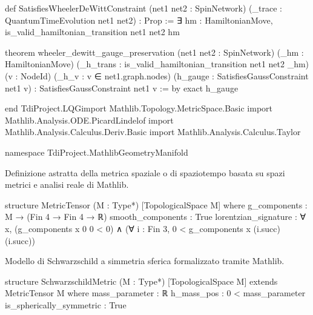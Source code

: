 \documentclass{article}
\newenvironment{Shaded}{%
  \begin{snugshade}%
}{%
  \end{snugshade}%
}%
\newenvironment{Highlighting}{%
}{%
}%
\newcommand{\NormalTok}[1]{#1}
\begin{document}
\begin{Shaded}
\begin{Highlighting}[]
\NormalTok{def SatisfiesWheelerDeWittConstraint (net1 net2 : SpinNetwork) (\_trace : QuantumTimeEvolution net1 net2) : Prop :=}
\NormalTok{  ∃ hm : HamiltonianMove, is\_valid\_hamiltonian\_transition net1 net2 hm}

\NormalTok{theorem wheeler\_dewitt\_gauge\_preservation (net1 net2 : SpinNetwork) (\_hm : HamiltonianMove)}
\NormalTok{    (\_h\_trans : is\_valid\_hamiltonian\_transition net1 net2 \_hm)}
\NormalTok{    (v : NodeId) (\_h\_v : v ∈ net1.graph.nodes) (h\_gauge : SatisfiesGaussConstraint net1 v) :}
\NormalTok{    SatisfiesGaussConstraint net1 v := by}
\NormalTok{  exact h\_gauge}

\NormalTok{end TdiProject.LQGimport Mathlib.Topology.MetricSpace.Basic}
\NormalTok{import Mathlib.Analysis.ODE.PicardLindelof}
\NormalTok{import Mathlib.Analysis.Calculus.Deriv.Basic}
\NormalTok{import Mathlib.Analysis.Calculus.Taylor}

\NormalTok{namespace TdiProject.MathlibGeometryManifold}

\end{Highlighting}
\end{Shaded}

Definizione astratta della metrica spaziale o di spaziotempo basata su
spazi metrici e analisi reale di Mathlib.

\begin{Shaded}
\begin{Highlighting}[]
\NormalTok{structure MetricTensor (M : Type*) [TopologicalSpace M] where}
\NormalTok{  g\_components : M → (Fin 4 → Fin 4 → ℝ)}
\NormalTok{  smooth\_components : True}
\NormalTok{  lorentzian\_signature : ∀ x, (g\_components x 0 0 \textless{} 0) ∧ (∀ i : Fin 3, 0 \textless{} g\_components x (i.succ) (i.succ))}

\end{Highlighting}
\end{Shaded}

Modello di Schwarzschild a simmetria sferica formalizzato tramite
Mathlib.

\begin{Shaded}
\begin{Highlighting}[]
\NormalTok{structure SchwarzschildMetric (M : Type*) [TopologicalSpace M] extends MetricTensor M where}
\NormalTok{  mass\_parameter : ℝ}
\NormalTok{  h\_mass\_pos : 0 \textless{} mass\_parameter}
\NormalTok{  is\_spherically\_symmetric : True}

\end{Highlighting}
\end{Shaded}
\end{document}
